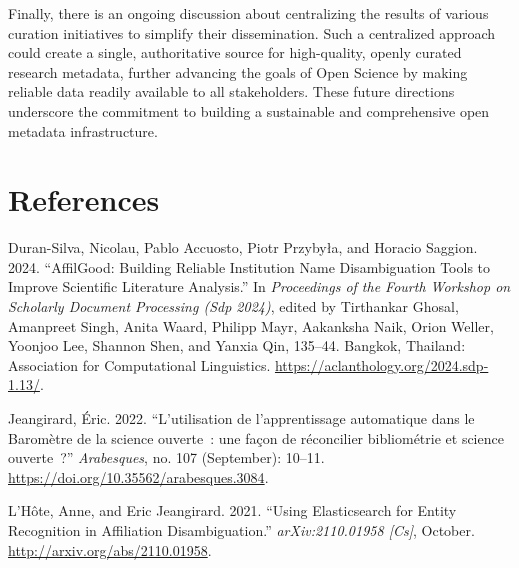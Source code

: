 \documentclass[
]{article}
\newlength{\cslhangindent}
\newenvironment{cslreferences}%
  {\setlength{\parindent}{0pt}%
  \everypar{\setlength{\hangindent}{\cslhangindent}}\ignorespaces}%
  {\par}
\begin{document}
Finally, there is an ongoing discussion about centralizing the results
of various curation initiatives to simplify their dissemination. Such a
centralized approach could create a single, authoritative source for
high-quality, openly curated research metadata, further advancing the
goals of Open Science by making reliable data readily available to all
stakeholders. These future directions underscore the commitment to
building a sustainable and comprehensive open metadata infrastructure.

\hypertarget{references}{%
\section*{References}\label{references}}

\hypertarget{refs}{}
\begin{cslreferences}
\leavevmode\hypertarget{ref-duran-silva-etal-2024-affilgood}{}%
Duran-Silva, Nicolau, Pablo Accuosto, Piotr Przybyła, and Horacio
Saggion. 2024. ``AffilGood: Building Reliable Institution Name
Disambiguation Tools to Improve Scientific Literature Analysis.'' In
\emph{Proceedings of the Fourth Workshop on Scholarly Document
Processing (Sdp 2024)}, edited by Tirthankar Ghosal, Amanpreet Singh,
Anita Waard, Philipp Mayr, Aakanksha Naik, Orion Weller, Yoonjoo Lee,
Shannon Shen, and Yanxia Qin, 135--44. Bangkok, Thailand: Association
for Computational Linguistics.
\url{https://aclanthology.org/2024.sdp-1.13/}.

\leavevmode\hypertarget{ref-jeangirard:hal-03819060}{}%
Jeangirard, Éric. 2022. ``L'utilisation de l'apprentissage automatique
dans le Baromètre de la science ouverte~: une façon de réconcilier
bibliométrie et science ouverte~?'' \emph{Arabesques}, no. 107
(September): 10--11. \url{https://doi.org/10.35562/arabesques.3084}.

\leavevmode\hypertarget{ref-lhote_using_2021}{}%
L'Hôte, Anne, and Eric Jeangirard. 2021. ``Using Elasticsearch for
Entity Recognition in Affiliation Disambiguation.''
\emph{arXiv:2110.01958 {[}Cs{]}}, October.
\url{http://arxiv.org/abs/2110.01958}.
\end{cslreferences}
\end{document}
